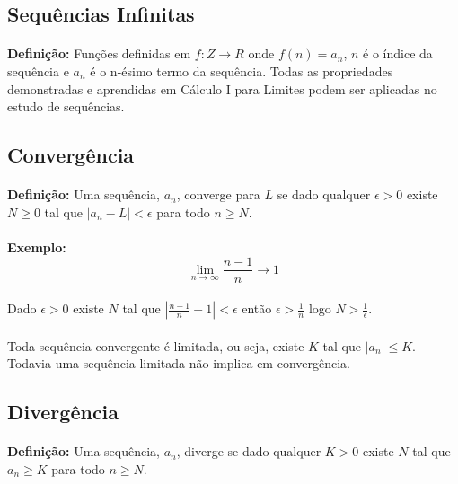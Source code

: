 \documentclass{article}
\begin{document}
\begin{enumerate}[rightmargin = \leftmargin]
\section{Sequências Infinitas}
    \paragraph{}\textbf{Definição:} Funções definidas em $f:Z\to R$ onde $f(n)=a_{n}$, $n$ é o índice da sequência e $a_{n}$ é o n-ésimo termo da sequência. Todas as propriedades demonstradas e aprendidas em Cálculo I para Limites podem ser aplicadas no estudo de sequências. 
    
    \subsection{Convergência}
        \paragraph{}\textbf{Definição:} Uma sequência, $a_{n}$, converge para $L$ se dado qualquer $\epsilon > 0$ existe $N \ge 0$ tal que $|a_{n}-L|<\epsilon$ para todo $n \ge N$.
        \paragraph{}\textbf{Exemplo:}
            \[\lim_{n\to\infty}\frac{n-1}{n}\rightarrow1\]
        \paragraph{}Dado $\epsilon>0$ existe $N$ tal que $|\frac{n-1}{n}-1|<\epsilon$ então $\epsilon>\frac{1}{n}$ logo $N>\frac{1}{\epsilon}$.
        \paragraph{} Toda sequência convergente é limitada, ou seja, existe $K$ tal que $|a_{n}| \le K$. Todavia uma sequência limitada não implica em convergência.
    
    \subsection{Divergência}
        \paragraph{}\textbf{Definição:} Uma sequência, $a_{n}$, diverge se dado qualquer $K>0$ existe $N$ tal que $a_{n} \ge K$ para todo $n \ge N$.

\end{enumerate}
\end{document}
